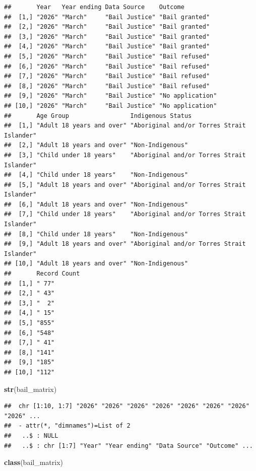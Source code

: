 \documentclass[
]{article}
\newenvironment{Shaded}{\begin{snugshade}}{\end{snugshade}}
\newcommand{\FunctionTok}[1]{\textcolor[rgb]{0.13,0.29,0.53}{\textbf{#1}}}
\newcommand{\NormalTok}[1]{#1}
\begin{document}
\begin{verbatim}
##       Year   Year ending Data Source    Outcome         
##  [1,] "2026" "March"     "Bail Justice" "Bail granted"  
##  [2,] "2026" "March"     "Bail Justice" "Bail granted"  
##  [3,] "2026" "March"     "Bail Justice" "Bail granted"  
##  [4,] "2026" "March"     "Bail Justice" "Bail granted"  
##  [5,] "2026" "March"     "Bail Justice" "Bail refused"  
##  [6,] "2026" "March"     "Bail Justice" "Bail refused"  
##  [7,] "2026" "March"     "Bail Justice" "Bail refused"  
##  [8,] "2026" "March"     "Bail Justice" "Bail refused"  
##  [9,] "2026" "March"     "Bail Justice" "No application"
## [10,] "2026" "March"     "Bail Justice" "No application"
##       Age Group                 Indigenous Status                         
##  [1,] "Adult 18 years and over" "Aboriginal and/or Torres Strait Islander"
##  [2,] "Adult 18 years and over" "Non-Indigenous"                          
##  [3,] "Child under 18 years"    "Aboriginal and/or Torres Strait Islander"
##  [4,] "Child under 18 years"    "Non-Indigenous"                          
##  [5,] "Adult 18 years and over" "Aboriginal and/or Torres Strait Islander"
##  [6,] "Adult 18 years and over" "Non-Indigenous"                          
##  [7,] "Child under 18 years"    "Aboriginal and/or Torres Strait Islander"
##  [8,] "Child under 18 years"    "Non-Indigenous"                          
##  [9,] "Adult 18 years and over" "Aboriginal and/or Torres Strait Islander"
## [10,] "Adult 18 years and over" "Non-Indigenous"                          
##       Record Count
##  [1,] " 77"       
##  [2,] " 43"       
##  [3,] "  2"       
##  [4,] " 15"       
##  [5,] "855"       
##  [6,] "548"       
##  [7,] " 41"       
##  [8,] "141"       
##  [9,] "185"       
## [10,] "112"
\end{verbatim}

\begin{Shaded}
\begin{Highlighting}[]
\FunctionTok{str}\NormalTok{(bail\_matrix)}
\end{Highlighting}
\end{Shaded}

\begin{verbatim}
##  chr [1:10, 1:7] "2026" "2026" "2026" "2026" "2026" "2026" "2026" "2026" ...
##  - attr(*, "dimnames")=List of 2
##   ..$ : NULL
##   ..$ : chr [1:7] "Year" "Year ending" "Data Source" "Outcome" ...
\end{verbatim}

\begin{Shaded}
\begin{Highlighting}[]
\FunctionTok{class}\NormalTok{(bail\_matrix)}
\end{Highlighting}
\end{Shaded}
\end{document}
